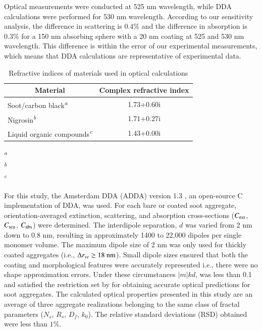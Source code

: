 \documentclass[12pt,authoryear]{elsarticle}
\begin{document}
Optical measurements were conducted at 525 nm wavelength, while DDA calculations were performed for 530 nm wavelength. According to our sensitivity analysis, the difference in scattering is $0.4 \%$ and the difference in absorption is $0.3 \%$ for a 150 nm absorbing sphere with a 20 nm coating at 525 and 530 nm wavelength. This difference is within the error of our experimental measurements, which means that DDA calculations are representative of experimental data.

\begin{table}[ht]
\caption{Refractive indices of materials used in optical calculations}
\label{tab:refindices}
\begin{center}
\begin{tabular}{ l c } 
 \hline
 \multicolumn{1}{c}{Material} & Complex refractive index \\
 \hline
 Soot/carbon black\textsuperscript{\textit{a}} & 1.73+0.60i\\
 Nigrosin\textsuperscript{\textit{b}} & 1.71+0.27i\\
 Liquid organic compounds\textsuperscript{\textit{c}} & 1.43+0.00i\\
 \hline
\end{tabular}
\end{center}

\textsuperscript{\textit{a}}\citet{RN23}\\
\textsuperscript{\textit{b}}\citet{RN15}\\
\textsuperscript{\textit{c}}\citet{RN22}
\end{table}

For this study, the Amsterdam DDA (ADDA) version 1.3 \citep{RN11}, an open-source C implementation of DDA, was used. For each bare or coated soot aggregate, orientation-averaged extinction, scattering, and absorption cross-sections ($C_{\rm ext}$, $C_{\rm sca}$, $C_{\rm abs}$) were determined. The interdipole separation, $d$ was varied from 2 nm down to 0.8 nm, resulting in approximately 1400 to 22,000 dipoles per single monomer volume. The maximum dipole size of 2 nm was only used for thickly coated aggregates (i.e., $\Delta r_{ve}\ge 18\ \rm nm$). Small dipole sizes ensured that both the coating and morphological features were accurately represented i.e., there were no shape approximation errors. Under these circumstances $|m|kd$, was less than 0.1 and satisfied the restriction set by \citet{RN32} for obtaining accurate optical predictions for soot aggregates. The calculated optical properties presented in this study are an average of three aggregate realizations belonging to the same class of fractal parameters ($N_s$, $R_s$, $D_f$, $k_0$). The relative standard deviations (RSD) obtained were less than $1\%$.
\end{document}
